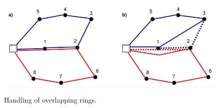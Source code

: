 \begin{figure}[h]
	\begin{centering}
		{\includegraphics[scale=1]{figures/approach/busnosplit.pdf}}
		\caption[Overlapping rings]{Handling of overlapping rings.}
		\label{fig:busnosplit}
	\end{centering}
\end{figure}
